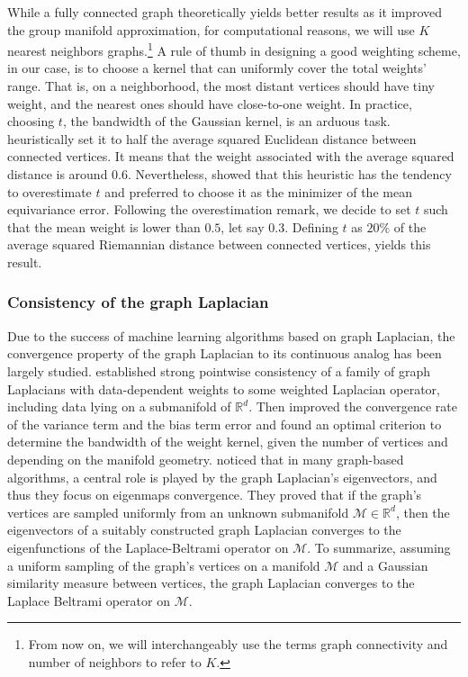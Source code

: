 \documentclass{article}
\begin{document}
While a fully connected graph theoretically yields better results as it improved the group manifold approximation, for computational reasons, we will use $K$ nearest neighbors graphs.\footnote{From now on, we will interchangeably use the terms graph connectivity and number of neighbors to refer to $K$.} A rule of thumb in designing a good weighting scheme, in our case, is to choose a kernel that can uniformly cover the total weights' range. That is, on a neighborhood, the most distant vertices should have tiny weight, and the nearest ones should have close-to-one weight. In practice, choosing $t$, the bandwidth of the Gaussian kernel, is an arduous task. \cite{perraudin2019deepsphere} heuristically set it to half the average squared Euclidean distance between connected vertices. It means that the weight associated with the average squared distance is around $0.6$. Nevertheless, \cite{defferrard2020deepsphere} showed that this heuristic has the tendency to overestimate $t$ and preferred to choose it as the minimizer of the mean equivariance error. Following the overestimation remark, we decide to set $t$ such that the mean weight is lower than $0.5$, let say $0.3$. Defining $t$ as $20\%$ of the average squared Riemannian distance between connected vertices, yields this result.


\subsubsection{Consistency of the graph Laplacian}

Due to the success of machine learning algorithms based on graph Laplacian, the convergence property of the graph Laplacian to its continuous analog has been largely studied. \cite{hein2005graphs} established strong pointwise consistency of a family of graph Laplacians with data-dependent weights to some weighted Laplacian operator, including data lying on a submanifold of $\mathbb{R}^d$. Then \cite{singer2006graph} improved the convergence rate of the variance term and the bias term error and found an optimal criterion to determine the bandwidth of the weight kernel, given the number of vertices and depending on the manifold geometry. \cite{belkin2006convergence} noticed that in many graph-based algorithms, a central role is played by the graph Laplacian's eigenvectors, and thus they focus on eigenmaps convergence. They proved that if the graph's vertices are sampled uniformly from an unknown submanifold $\mathcal{M} \in \mathbb{R}^d$, then the eigenvectors of a suitably constructed graph Laplacian converges to the eigenfunctions of the Laplace-Beltrami operator on $\mathcal{M}$. To summarize, assuming a uniform sampling of the graph's vertices on a manifold $\mathcal{M}$ and a Gaussian similarity measure between vertices, the graph Laplacian converges to the Laplace Beltrami operator on $\mathcal{M}$.
\end{document}
